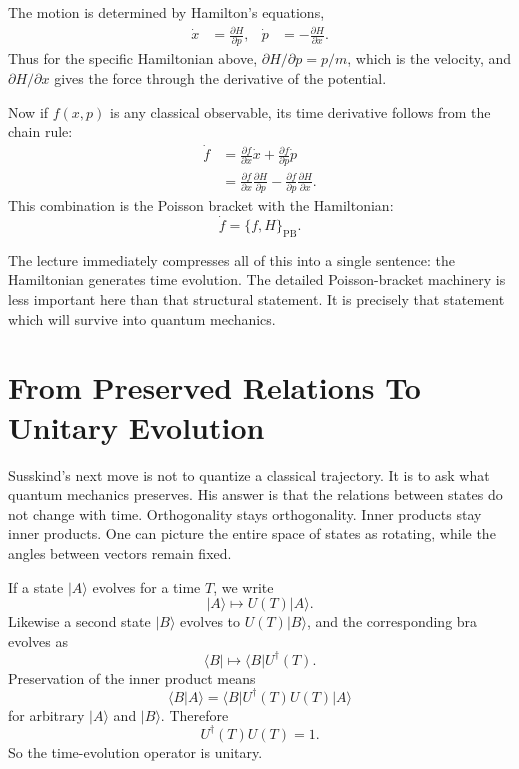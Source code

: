 The motion is determined by Hamilton's equations,
\begin{align}
\dot x &= \frac{\partial H}{\partial p}, &
\dot p &= -\frac{\partial H}{\partial x}.
\end{align}
Thus for the specific Hamiltonian above, $\partial H/\partial p=p/m$, which is the velocity, and $\partial H/\partial x$ gives the force through the derivative of the potential.

Now if $f(x,p)$ is any classical observable, its time derivative follows from the chain rule:
\begin{align}
\dot f
&= \frac{\partial f}{\partial x}\dot x+\frac{\partial f}{\partial p}\dot p \\
&= \frac{\partial f}{\partial x}\frac{\partial H}{\partial p}
   -\frac{\partial f}{\partial p}\frac{\partial H}{\partial x}.
\end{align}
This combination is the Poisson bracket with the Hamiltonian:
\begin{equation}
\dot f=\{f,H\}_{\mathrm{PB}}.
\end{equation}

The lecture immediately compresses all of this into a single sentence: the Hamiltonian generates time evolution. The detailed Poisson-bracket machinery is less important here than that structural statement. It is precisely that statement which will survive into quantum mechanics.

\section{From Preserved Relations To Unitary Evolution}

Susskind's next move is not to quantize a classical trajectory. It is to ask what quantum mechanics preserves. His answer is that the relations between states do not change with time. Orthogonality stays orthogonality. Inner products stay inner products. One can picture the entire space of states as rotating, while the angles between vectors remain fixed.

If a state $|A\rangle$ evolves for a time $T$, we write
\begin{equation}
|A\rangle \mapsto U(T)|A\rangle.
\end{equation}
Likewise a second state $|B\rangle$ evolves to $U(T)|B\rangle$, and the corresponding bra evolves as
\begin{equation}
\langle B| \mapsto \langle B|U^\dagger(T).
\end{equation}
Preservation of the inner product means
\begin{equation}
\langle B|A\rangle=\langle B|U^\dagger(T)U(T)|A\rangle
\end{equation}
for arbitrary $|A\rangle$ and $|B\rangle$. Therefore
\begin{equation}
U^\dagger(T)U(T)=1.
\end{equation}
So the time-evolution operator is unitary.

